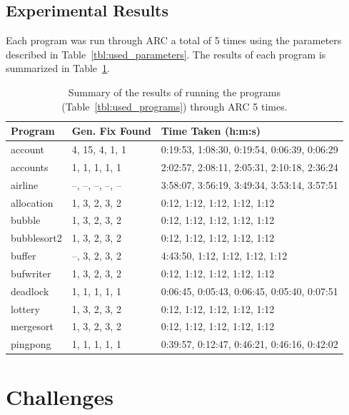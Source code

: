 \documentclass{llncs}
\begin{document}
\subsection{Experimental Results}
\label{sec:experimental_results}

Each program was run through ARC a total of 5 times using the parameters
described in Table~\ref{tbl:used_parameters}. The results of each program is
summarized in Table~\ref{tbl:summary_results}.

\begin{table}%
\caption{Summary of the results of running the programs
(Table~\ref{tbl:used_programs}) through ARC 5 times.}
\begin{center}
\lstset{basicstyle=\scriptsize}
\begin{tabular}{|l|l|l|}
\hline
\textbf{Program} & \textbf{Gen. Fix Found} & \textbf{Time Taken (h:m:s)}\\
\hline
account & 4, 15, 4, 1, 1 & 0:19:53, 1:08:30, 0:19:54, 0:06:39, 0:06:29\\
\hline
accounts & 1, 1, 1, 1, 1 & 2:02:57, 2:08:11, 2:05:31, 2:10:18, 2:36:24\\
\hline
airline & --, --, --, --, -- & 3:58:07, 3:56:19, 3:49:34, 3:53:14, 3:57:51\\
\hline
allocation & 1, 3, 2, 3, 2 & 0:12, 1:12, 1:12, 1:12, 1:12\\
\hline
bubble & 1, 3, 2, 3, 2 & 0:12, 1:12, 1:12, 1:12, 1:12\\
\hline
bubblesort2 & 1, 3, 2, 3, 2 & 0:12, 1:12, 1:12, 1:12, 1:12\\
\hline
buffer & --, 3, 2, 3, 2 & 4:43:50, 1:12, 1:12, 1:12, 1:12\\
\hline
bufwriter & 1, 3, 2, 3, 2 & 0:12, 1:12, 1:12, 1:12, 1:12\\
\hline
deadlock & 1, 1, 1, 1, 1 & 0:06:45, 0:05:43, 0:06:45, 0:05:40, 0:07:51\\
\hline
lottery & 1, 3, 2, 3, 2 & 0:12, 1:12, 1:12, 1:12, 1:12\\
\hline
mergesort & 1, 3, 2, 3, 2 & 0:12, 1:12, 1:12, 1:12, 1:12\\
\hline
pingpong & 1, 1, 1, 1, 1 & 0:39:57, 0:12:47, 0:46:21, 0:46:16, 0:42:02\\
\hline
\end{tabular}
\label{tbl:summary_results}
\end{center}
\end{table}


\section{Challenges}
\label{sec:challenges}
\end{document}
